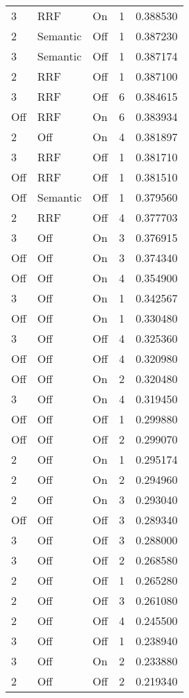 \begin{tabular}{llllr}
3 & RRF & On & 1 & 0.388530 \\
2 & Semantic & Off & 1 & 0.387230 \\
3 & Semantic & Off & 1 & 0.387174 \\
2 & RRF & Off & 1 & 0.387100 \\
3 & RRF & Off & 6 & 0.384615 \\
Off & RRF & On & 6 & 0.383934 \\
2 & Off & On & 4 & 0.381897 \\
3 & RRF & Off & 1 & 0.381710 \\
Off & RRF & Off & 1 & 0.381510 \\
Off & Semantic & Off & 1 & 0.379560 \\
2 & RRF & Off & 4 & 0.377703 \\
3 & Off & On & 3 & 0.376915 \\
Off & Off & On & 3 & 0.374340 \\
Off & Off & On & 4 & 0.354900 \\
3 & Off & On & 1 & 0.342567 \\
Off & Off & On & 1 & 0.330480 \\
3 & Off & Off & 4 & 0.325360 \\
Off & Off & Off & 4 & 0.320980 \\
Off & Off & On & 2 & 0.320480 \\
3 & Off & On & 4 & 0.319450 \\
Off & Off & Off & 1 & 0.299880 \\
Off & Off & Off & 2 & 0.299070 \\
2 & Off & On & 1 & 0.295174 \\
2 & Off & On & 2 & 0.294960 \\
2 & Off & On & 3 & 0.293040 \\
Off & Off & Off & 3 & 0.289340 \\
3 & Off & Off & 3 & 0.288000 \\
3 & Off & Off & 2 & 0.268580 \\
2 & Off & Off & 1 & 0.265280 \\
2 & Off & Off & 3 & 0.261080 \\
2 & Off & Off & 4 & 0.245500 \\
3 & Off & Off & 1 & 0.238940 \\
3 & Off & On & 2 & 0.233880 \\
2 & Off & Off & 2 & 0.219340 \\
\bottomrule
\end{tabular}
